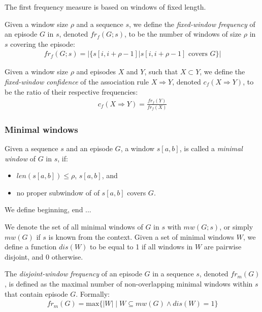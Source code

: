 The first frequency measure is based on windows of fixed length.

\begin{definition}
Given a window size $ \rho $ and a sequence $ s $, we define the \emph{fixed-window frequency} of an episode $ G $ in $ s $, denoted $ fr_f(G; s) $, to be the number of windows of size $ \rho $ in $ s $ covering the episode:
\begin{align*}
fr_f(G; s) = | \{ s[i, i + \rho - 1] | s[i, i + \rho - 1] \text{ covers } G \} |
\end{align*}
\end{definition}

\begin{definition}
Given a window size $ \rho $ and episodes $ X $ and $ Y $, such that $ X \subset Y $, we define the \emph{fixed-window confidence} of the association rule $ X \Rightarrow Y $, denoted $ c_f(X \Rightarrow Y) $, to be the ratio of their respective frequencies:
\begin{align*}
c_f(X \Rightarrow Y) = \frac{ fr_f(Y) }{ fr_f(X) }
\end{align*}
\end{definition}

\subsubsection{Minimal windows}

\begin{definition}
Given a sequence $ s $ and an episode $ G $, a window $ s[a, b] $, is called a \emph{minimal window} of $ G $ in $ s $, if:
\begin{itemize}
\item $ len(s[a, b]) \leq \rho $, $ s[a, b] $, and
\item no proper subwindow of of $ s[a, b] $ covers $ G $.
\end{itemize}
We define beginning, end ... %

We denote the set of all minimal windows of $ G $ in $ s $ with $ mw(G; s) $, or simply $ mw(G) $ if $ s $ is known from the context. Given a set of minimal windows $ W $, we define a function $ dis(W) $ to be equal to 1 if all windows in $ W $ are pairwise disjoint, and 0 otherwise.
\end{definition}

\begin{definition}
The \emph{disjoint-window frequency} of an episode $ G $ in a sequence $ s $, denoted $ fr_m(G) $, is defined as the maximal number of non-overlapping minimal windows within $ s $ that contain episode $ G $. Formally:
\begin{align*}
fr_m(G) = \text{max} \{ | W | \mid W \subseteq mw(G) \wedge dis(W) = 1 \}
\end{align*}
\end{definition}

